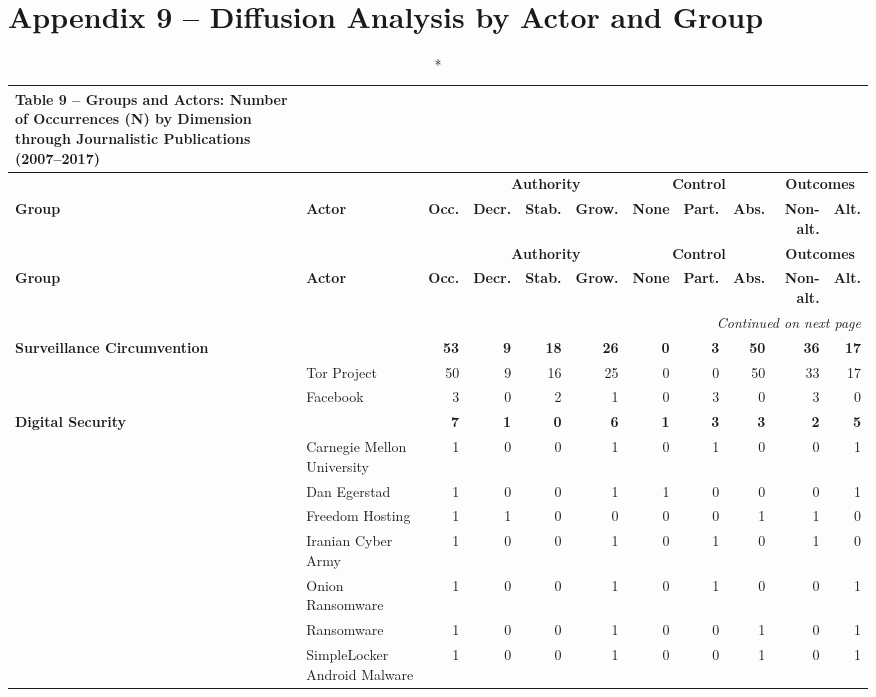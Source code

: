 \newpage

\section*{Appendix 9 -- Diffusion Analysis by Actor and Group}

{\scriptsize
\begin{longtable}{p{1.6cm} p{1.9cm} r r r r r r r r r}
\caption*{Table 9 -- Groups and Actors: Number of Occurrences (N) by Dimension through Journalistic Publications (2007--2017)} \\
\toprule
& & & \multicolumn{3}{c}{\textbf{Authority}} & \multicolumn{3}{c}{\textbf{Control}} & \multicolumn{2}{c}{\textbf{Outcomes}} \\
\cmidrule(lr){4-6} \cmidrule(lr){7-9} \cmidrule(lr){10-11}
\textbf{Group} & \textbf{Actor} & \textbf{Occ.} & \textbf{Decr.} & \textbf{Stab.} & \textbf{Grow.} & \textbf{None} & \textbf{Part.} & \textbf{Abs.} & \textbf{Non-alt.} & \textbf{Alt.} \\
\midrule
\endfirsthead
\toprule
& & & \multicolumn{3}{c}{\textbf{Authority}} & \multicolumn{3}{c}{\textbf{Control}} & \multicolumn{2}{c}{\textbf{Outcomes}} \\
\cmidrule(lr){4-6} \cmidrule(lr){7-9} \cmidrule(lr){10-11}
\textbf{Group} & \textbf{Actor} & \textbf{Occ.} & \textbf{Decr.} & \textbf{Stab.} & \textbf{Grow.} & \textbf{None} & \textbf{Part.} & \textbf{Abs.} & \textbf{Non-alt.} & \textbf{Alt.} \\
\midrule
\endhead
\midrule
\multicolumn{11}{r}{\textit{Continued on next page}} \\
\bottomrule
\endfoot
\bottomrule
\endlastfoot

\textbf{Surveillance Circumvention} & & \textbf{53} & \textbf{9} & \textbf{18} & \textbf{26} & \textbf{0} & \textbf{3} & \textbf{50} & \textbf{36} & \textbf{17} \\
 & Tor Project & 50 & 9 & 16 & 25 & 0 & 0 & 50 & 33 & 17 \\
 & Facebook & 3 & 0 & 2 & 1 & 0 & 3 & 0 & 3 & 0 \\
\midrule

\textbf{Digital Security} & & \textbf{7} & \textbf{1} & \textbf{0} & \textbf{6} & \textbf{1} & \textbf{3} & \textbf{3} & \textbf{2} & \textbf{5} \\
 & Carnegie Mellon University & 1 & 0 & 0 & 1 & 0 & 1 & 0 & 0 & 1 \\
 & Dan Egerstad & 1 & 0 & 0 & 1 & 1 & 0 & 0 & 0 & 1 \\
 & Freedom Hosting & 1 & 1 & 0 & 0 & 0 & 0 & 1 & 1 & 0 \\
 & Iranian Cyber Army & 1 & 0 & 0 & 1 & 0 & 1 & 0 & 1 & 0 \\
 & Onion Ransomware & 1 & 0 & 0 & 1 & 0 & 1 & 0 & 0 & 1 \\
 & Ransomware & 1 & 0 & 0 & 1 & 0 & 0 & 1 & 0 & 1 \\
 & SimpleLocker Android Malware & 1 & 0 & 0 & 1 & 0 & 0 & 1 & 0 & 1 \\
\midrule


\end{longtable}}
